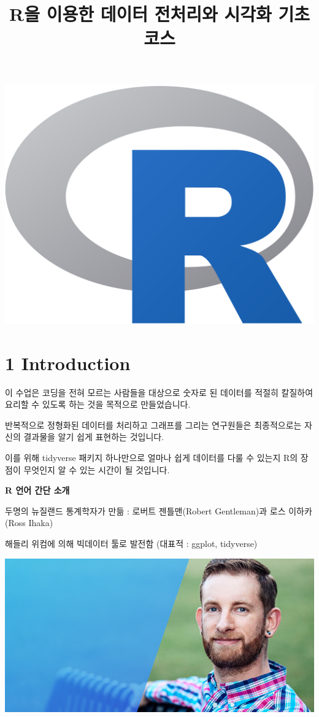 \documentclass[
  letterpaper,
  DIV=11,
  numbers=noendperiod]{scrartcl}
\title{R을 이용한 데이터 전처리와 시각화 기초 코스}
\author{}
\date{}
\renewcommand*\contentsname{Table of contents}
\newcommand\contentsname{Table of contents}
\begin{document}
\maketitle

\renewcommand*\contentsname{Table of contents}
{
\hypersetup{linkcolor=}
\setcounter{tocdepth}{3}
\tableofcontents
}
\includegraphics{typst2_files/mediabag/1200px-R_logo.svg.png}

\section{1 Introduction}\label{introduction}

이 수업은 코딩을 전혀 모르는 사람들을 대상으로 숫자로 된 데이터를 적절히
칼질하여 요리할 수 있도록 하는 것을 목적으로 만들었습니다.

반복적으로 정형화된 데이터를 처리하고 그래프를 그리는 연구원들은
최종적으로는 자신의 결과물을 알기 쉽게 표현하는 것입니다.

이를 위해 tidyverse 패키지 하나만으로 얼마나 쉽게 데이터를 다룰 수
있는지 R의 장점이 무엇인지 알 수 있는 시간이 될 것입니다.

\textbf{R 언어 간단 소개}

두명의 뉴질랜드 통계학자가 만듦 : 로버트 젠틀맨(Robert Gentleman)과 로스
이하카(Ross Ihaka)

해들리 위컴에 의해 빅데이터 툴로 발전함 (대표적 : ggplot, tidyverse)

\includegraphics{typst2_files/mediabag/9.28-1.png}
\end{document}
